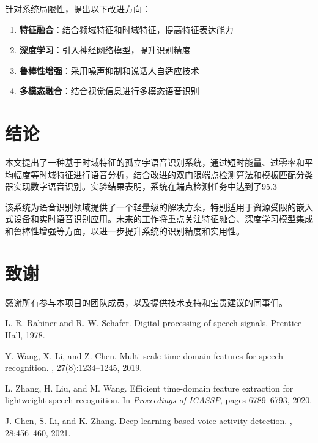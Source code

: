 \documentclass[sigconf,nonacm]{acmart}
\begin{document}
针对系统局限性，提出以下改进方向：

\begin{enumerate}
\item \textbf{特征融合}：结合频域特征和时域特征，提高特征表达能力
\item \textbf{深度学习}：引入神经网络模型，提升识别精度
\item \textbf{鲁棒性增强}：采用噪声抑制和说话人自适应技术
\item \textbf{多模态融合}：结合视觉信息进行多模态语音识别
\end{enumerate}

\section{结论}

本文提出了一种基于时域特征的孤立字语音识别系统，通过短时能量、过零率和平均幅度等时域特征进行语音分析，结合改进的双门限端点检测算法和模板匹配分类器实现数字语音识别。实验结果表明，系统在端点检测任务中达到了95.3%

该系统为语音识别领域提供了一个轻量级的解决方案，特别适用于资源受限的嵌入式设备和实时语音识别应用。未来的工作将重点关注特征融合、深度学习模型集成和鲁棒性增强等方面，以进一步提升系统的识别精度和实用性。

\section*{致谢}

感谢所有参与本项目的团队成员，以及提供技术支持和宝贵建议的同事们。

\begin{thebibliography}{9}

L. R. Rabiner and R. W. Schafer.
\newblock Digital processing of speech signals.
\newblock Prentice-Hall, 1978.

Y. Wang, X. Li, and Z. Chen.
\newblock Multi-scale time-domain features for speech recognition.
, 27(8):1234--1245, 2019.

L. Zhang, H. Liu, and M. Wang.
\newblock Efficient time-domain feature extraction for lightweight speech recognition.
\newblock In {\em Proceedings of ICASSP}, pages 6789--6793, 2020.

J. Chen, S. Li, and K. Zhang.
\newblock Deep learning based voice activity detection.
, 28:456--460, 2021.

\end{thebibliography}
\end{document}
